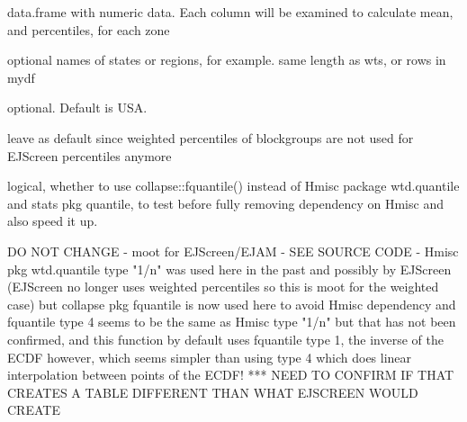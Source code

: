 \documentclass[a4paper]{book}
\begin{document}
\begin{Arguments}
\begin{ldescription}
\item[\code{x}] data.frame with numeric data. Each column will be examined to calculate
mean,   and percentiles, for each zone

\item[\code{zone.vector}] optional names of states or regions, for example. same length as wts, or rows in mydf

\item[\code{zoneOverallName}] optional. Default is USA.

\item[\code{wts}] leave as default since weighted percentiles of blockgroups are not used for EJScreen percentiles anymore

\item[\code{usecollapse}] logical, whether to use collapse::fquantile()
instead of Hmisc package wtd.quantile and stats pkg quantile,
to test before fully removing dependency on Hmisc and also speed it up.

\item[\code{type}] DO NOT CHANGE - moot for EJScreen/EJAM - SEE SOURCE CODE - Hmisc pkg wtd.quantile type "1/n" was used here in the past and possibly by EJScreen
(EJScreen no longer uses weighted percentiles so this is moot for the weighted case)
but collapse pkg fquantile is now used here to avoid Hmisc dependency
and fquantile type 4 seems to be the same as Hmisc type "1/n" but that has not been confirmed,
and this function by default uses fquantile type 1, the inverse of the ECDF however,
which seems simpler than using type 4 which does linear interpolation between points of the ECDF!
***  NEED TO CONFIRM IF THAT CREATES A TABLE DIFFERENT THAN WHAT EJSCREEN WOULD CREATE
\end{ldescription}
\end{Arguments}
%
\end{document}
